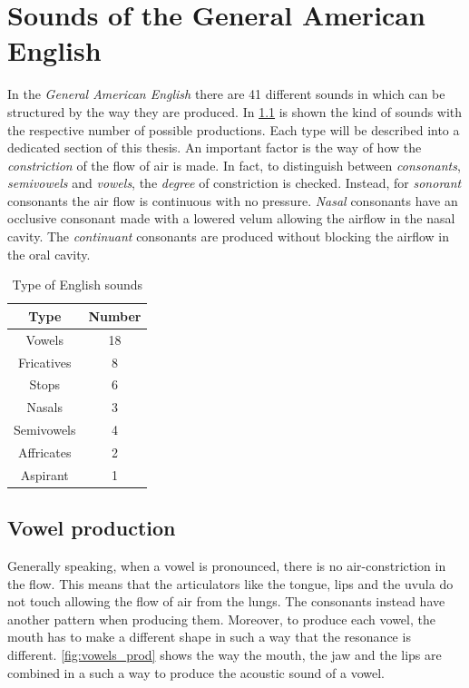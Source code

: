 \chapter{Sounds of the General American English}
\label{ch:english_language}
In the \textit{General American English} there are 41 different sounds in which can be structured by the way they are produced. In \ref{table:english_sounds} is shown the kind of sounds with the respective number of possible productions. Each type will be described into a dedicated section of this thesis. An important factor is the way of how the \textit{constriction} of the flow of air is made. In fact, to distinguish between \textit{consonants}, \textit{semivowels} and \textit{vowels}, the \textit{degree} of constriction is checked. Instead, for \textit{sonorant} consonants the air flow is continuous with no pressure. \textit{Nasal} consonants have an occlusive consonant made with a lowered velum allowing the airflow in the nasal cavity. The \textit{continuant} consonants are produced without blocking the airflow in the oral cavity.

\begin{table}[h]
    \centering
    \begin{tabular}{|c|c|}
        \hline
        \textbf{Type}& \textbf{Number} \\ \hline
        Vowels     & 18     \\ \hline
        Fricatives & 8      \\ \hline
        Stops      & 6      \\ \hline
        Nasals     & 3      \\ \hline
        Semivowels & 4      \\ \hline
        Affricates & 2      \\ \hline
        Aspirant   & 1      \\ \hline
    \end{tabular}
    \caption {Type of English sounds}
\label{table:english_sounds}
\end{table}


\section{Vowel production}
\label{sec:vowel_production}
Generally speaking, when a vowel is pronounced, there is no air-constriction in the flow. This means that the articulators like the tongue, lips and the uvula do not touch allowing the flow of air from the lungs. The consonants instead have another pattern when producing them. Moreover, to produce each vowel, the mouth has to make a different shape in such a way that the resonance is different. \ref{fig:vowels_prod} shows the way the mouth, the jaw and the lips are combined in a such a way to produce the acoustic sound of a vowel.

